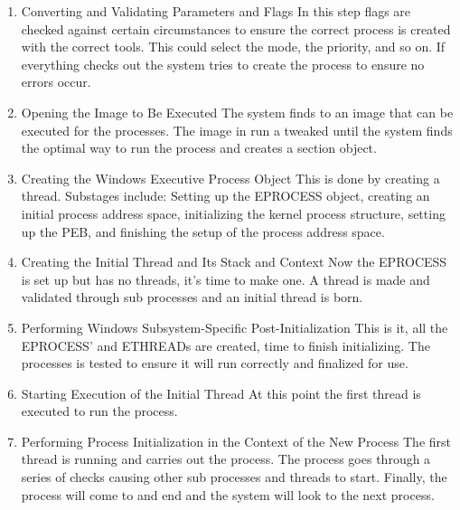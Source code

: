 \documentclass[onecolumn, draftclsnofoot,10pt, compsoc]{IEEEtran}
\begin{document}
\begin{enumerate}
	\item Converting and Validating Parameters and Flags
	\subitem In this step flags are checked against certain             circumstances to ensure the correct process is created with the correct tools. This could select the mode, the priority, and so on. If everything checks out the system tries to create the process to ensure no errors occur.
	\item Opening the Image to Be Executed
	\subitem The system finds to an image that can be executed for the processes. The image in run a tweaked until the system finds the optimal way to run the process and creates a section object.
	\item Creating the Windows Executive Process Object 
	\subitem This is done by creating a thread. Substages include: Setting up the EPROCESS object, creating an initial process address space, initializing the kernel process structure, setting up the PEB, and finishing the setup of the process address space.
	\item Creating the Initial Thread and Its Stack and Context
	\subitem Now the EPROCESS is set up but has no threads, it's time to make one. A thread is made and validated through sub processes and an initial thread is born.
	\item Performing Windows Subsystem-Specific Post-Initialization
	\subitem This is it, all the EPROCESS' and ETHREADs are created, time to finish initializing. The processes is tested to ensure it will run correctly and finalized for use.
	\item Starting Execution of the Initial Thread
	\subitem At this point the first thread is executed to run the process.
	\item Performing Process Initialization in the Context of the New Process
	\subitem The first thread is running and carries out the process. The process goes through a series of checks causing other sub processes and threads to start. Finally, the process will come to and end and the system will look to the next process.
\end{enumerate}
\end{document}
